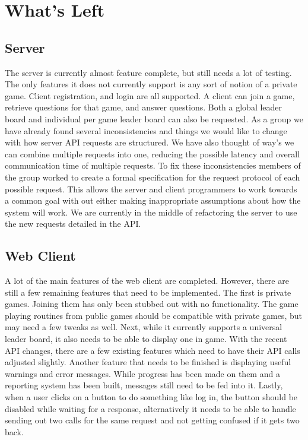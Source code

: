 \documentclass{dependencies/acm_proc_article-sp}
\begin{document}
\section {What's Left}
\subsection {Server}
The server is currently almost feature complete, but still needs a lot of
testing. The only features it does not currently support is any sort of notion
of a private game. Client registration, and login are all supported. A client can
join a game, retrieve questions for that game, and answer questions. Both a
global leader board and individual per game leader board can also be requested.
As a group we have already found several inconsistencies and things we would
like to change with how server API requests are structured. We have also thought of
way's we can combine multiple requests into one, reducing the possible latency
and overall communication time of multiple requests. To fix these
inconsistencies members of the group worked to create a formal specification
for the request protocol of each possible request. This allows the server and client
programmers to work towards a common goal with out either making inappropriate
assumptions about how the system will work. We are currently in the middle
of refactoring the server to use the new requests detailed in the API.

\subsection {Web Client}
A lot of the main features of the web client are completed.
However, there are still a few remaining features that need to be implemented.
The first is private games.
Joining them has only been stubbed out with no functionality.
The game playing routines from public games should be compatible with private games, but may need a few tweaks as well.
Next, while it currently supports a universal leader board, it also needs to be able to display one in game.
With the recent API changes, there are a few existing features which need to have their API calls adjusted slightly.
Another feature that needs to be finished is displaying useful warnings and error messages.
While progress has been made on them and a reporting system has been built, messages still need to be fed into it.
Lastly, when a user clicks on a button to do something like log in, the button should be disabled while waiting for a response,
alternatively it needs to be able to handle sending out two calls for the same request and not getting confused if it gets two back.
\end{document}
